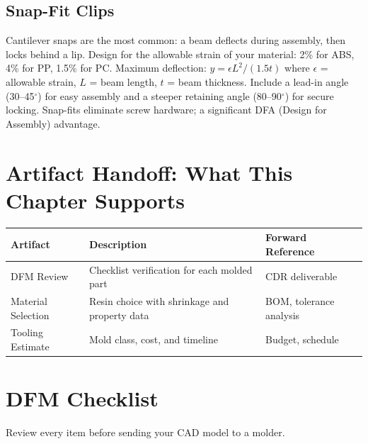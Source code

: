 \documentclass[11pt,letterpaper,twoside,openany]{book}
\begin{document}
\subsection{Snap-Fit Clips}
Cantilever snaps are the most common: a beam deflects during assembly, then locks behind a lip. Design for the allowable strain of your material: 2\% for ABS, 4\% for PP, 1.5\% for PC. Maximum deflection: $y = \epsilon L^2 / (1.5t)$ where $\epsilon$ = allowable strain, $L$ = beam length, $t$ = beam thickness. Include a lead-in angle (30--45$^{\circ}$) for easy assembly and a steeper retaining angle (80--90$^{\circ}$) for secure locking. Snap-fits eliminate screw hardware; a significant DFA (Design for Assembly) advantage.

\section{Artifact Handoff: What This Chapter Supports}
\begin{table}[htbp]\centering\small
\begin{tabularx}{\textwidth}{l X l}
\toprule
\textbf{Artifact} & \textbf{Description} & \textbf{Forward Reference} \\
\midrule
DFM Review & Checklist verification for each molded part & CDR deliverable \\
Material Selection & Resin choice with shrinkage and property data & BOM, tolerance analysis \\
Tooling Estimate & Mold class, cost, and timeline & Budget, schedule \\
\bottomrule
\end{tabularx}
\end{table}

\section{DFM Checklist}
\label{sec:checklist_b}

Review every item before sending your CAD model to a molder.
\end{document}

